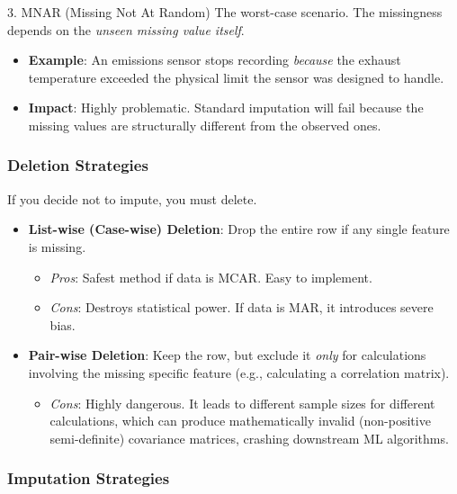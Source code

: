 \documentclass[11pt]{article}
\theoremstyle{smallexample}
\begin{document}
\begin{defbox}{3. MNAR (Missing Not At Random)}
    The worst-case scenario. The missingness depends on the \textit{unseen missing value itself}.
    \begin{itemize}
        \item \textbf{Example}: An emissions sensor stops recording \textit{because} the exhaust temperature exceeded the physical limit the sensor was designed to handle.
        \item \textbf{Impact}: Highly problematic. Standard imputation will fail because the missing values are structurally different from the observed ones.
    \end{itemize}
\end{defbox}

\subsubsection{Deletion Strategies}

If you decide not to impute, you must delete.

\begin{itemize}
    \item \textbf{List-wise (Case-wise) Deletion}: Drop the entire row if any single feature is missing. 
    \begin{itemize}
        \item \textit{Pros}: Safest method if data is MCAR. Easy to implement.
        \item \textit{Cons}: Destroys statistical power. If data is MAR, it introduces severe bias.
    \end{itemize}
    \item \textbf{Pair-wise Deletion}: Keep the row, but exclude it \textit{only} for calculations involving the missing specific feature (e.g., calculating a correlation matrix).
    \begin{itemize}
        \item \textit{Cons}: Highly dangerous. It leads to different sample sizes for different calculations, which can produce mathematically invalid (non-positive semi-definite) covariance matrices, crashing downstream ML algorithms.
    \end{itemize}
\end{itemize}

\subsubsection{Imputation Strategies}
\end{document}
